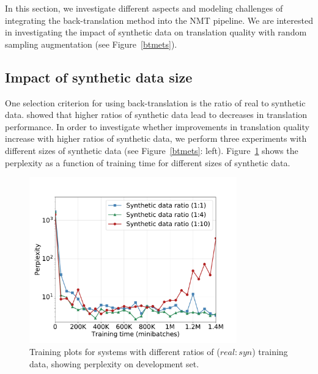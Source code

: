 In this section, we investigate different aspects and modeling challenges of integrating the back-translation method into the NMT pipeline.
We are interested in investigating the impact of synthetic data on translation quality with random sampling augmentation (see Figure~\ref{btmets}).

\subsection{Impact of synthetic data size}

One selection criterion for using back-translation is the ratio of real to synthetic data.
\citet{sennrich-haddow-birch:2016:P16-11} showed that higher ratios of synthetic data lead to decreases in translation performance. 
%
In order to investigate whether improvements in translation quality increase with higher ratios of synthetic data, we perform three experiments with different sizes of synthetic data (see Figure~\ref{btmets}: left).
Figure~\ref{ppl} shows the perplexity as a function of training time for different sizes of synthetic data.

\begin{figure}[htb!]
\begin{center}
\includegraphics[width=0.8\textwidth]{05-research-03/figs/newppl}
\caption{Training plots for systems with different ratios of  (\mbox{$real:syn$}) training data, showing perplexity on development set.}
\label{ppl}
\end{center}
\end{figure}

